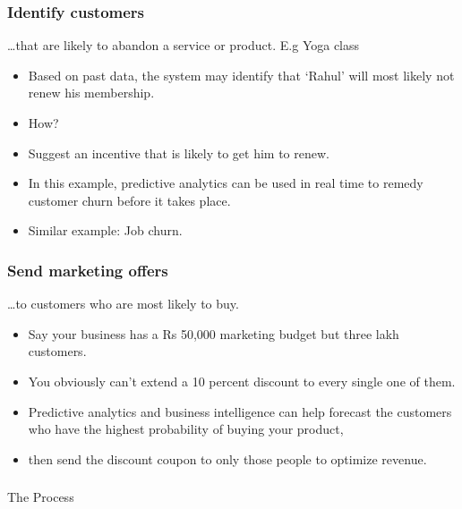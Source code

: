 \begin{frame}\frametitle{Identify customers}
\ldots that are likely to abandon a service or product. E.g Yoga class

\begin{itemize}
\item Based on past data, the system may identify that `Rahul' will most likely not renew his membership.
\item How?
\item Suggest an incentive that is likely to get him to renew.
\item In this example, predictive analytics can be used in real time to remedy customer churn before it takes place.
\item Similar example: Job churn.
\end{itemize}

\end{frame}

\begin{frame}\frametitle{Send marketing offers}
\ldots to customers who are most likely to buy.

\begin{itemize}
\item Say your business has a Rs 50,000 marketing budget but three lakh customers.
\item You obviously can't extend a 10 percent discount to every single one of them.
\item Predictive analytics and business intelligence can help forecast the customers who have the highest probability of buying your product,
\item then send the discount coupon to only those people to optimize revenue.
\end{itemize}

\end{frame}

\begin{frame}[fragile]\frametitle{}
\begin{center}
{\Large The Process}
\end{center}
\end{frame}



